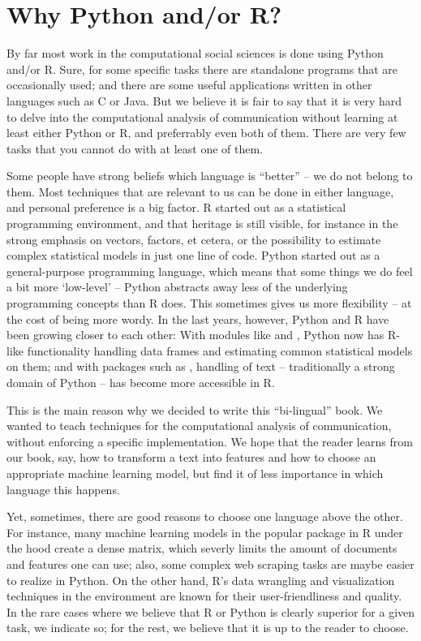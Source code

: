

\section{Why Python and/or R?}
By far most work in the computational social sciences is done using
Python and/or R. Sure, for some specific tasks there are standalone
programs that are occasionally used; and there are some useful applications
written in other languages such as C or Java. But we believe it is
fair to say that it is very hard to delve into the computational analysis
of communication without learning at least either Python or R, and
preferrably even both of them.
There are very few tasks that you cannot do with at least one of them.

Some people have strong beliefs which language is ``better'' -- we do
not belong to them. Most techniques that are relevant to us can be
done in either language, and personal preference is a big factor. R
started out as a statistical programming environment, and that
heritage is still visible, for instance in the strong emphasis on
vectors, factors, et cetera, or the possibility to estimate complex
statistical models in just one line of code. Python started out as a
general-purpose programming language, which means that some things we
do feel a bit more `low-level' -- Python abstracts away less of the
underlying programming concepts than R does. This sometimes gives us
more flexibility -- at the cost of being more wordy.
In the last years, however, Python and R have been
growing closer to each other: With modules like  and
, Python now has R-like functionality handling data
frames and estimating common statistical models on them; and with
packages such as , handling of text -- traditionally a
strong domain of Python -- has become more accessible in R.

This is the main reason why we decided to write this ``bi-lingual''
book. We wanted to teach techniques for the computational analysis of
communication, without enforcing a specific implementation. We hope
that the reader learns from our book, say, how to transform a text
into features and how to choose an appropriate machine learning model,
but find it of less importance in which language this happens.

Yet, sometimes, there are good reasons to choose one language above
the other. For instance, many machine learning models in the popular  package in R under the
hood create a dense matrix, which severly limits the amount of
documents and features one can use; also, some complex web scraping
tasks are maybe easier to realize in Python. On the other hand, R's
data wrangling and visualization techniques in the 
environment are known for their user-friendliness and quality.  In the
rare cases where we believe that R or Python is clearly superior for a
given task, we indicate so; for the rest, we believe that it is up to
the reader to choose.


